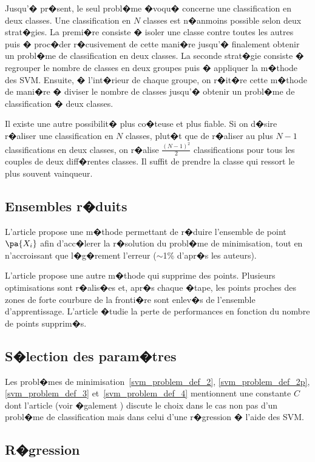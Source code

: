 Jusqu'� pr�sent, le seul probl�me �voqu� concerne une classification en deux classes. Une classification en $N$ classes est n�anmoins possible selon deux strat�gies. La premi�re consiste � isoler une classe contre toutes les autres puis � proc�der r�cusivement de cette mani�re jusqu'� finalement obtenir un probl�me de classification en deux classes. La seconde strat�gie consiste � regrouper le nombre de classes en deux groupes puis � appliquer la m�thode des SVM. Ensuite, � l'int�rieur de chaque groupe, on r�it�re cette m�thode de mani�re � diviser le nombre de classes jusqu'� obtenir un probl�me de classification � deux classes.

Il existe une autre possibilit� plus co�teuse et plus fiable. Si on d�sire r�aliser une classification en $N$ classes, plut�t que de r�aliser au plus $N-1$ classifications en deux classes, on r�alise $\frac{(N-1)^2}{2}$ classifications pour tous les couples de deux diff�rentes classes. Il suffit de prendre la classe qui ressort le plus souvent vainqueur.


\subsection{Ensembles r�duits}

L'article  propose une m�thode permettant de r�duire l'ensemble de point $\pa{X_i}$ afin d'acc�lerer la r�solution du probl�me de minimisation, tout en n'accroissant que l�g�rement l'erreur ($\sim$1\% d'apr�s les auteurs). 

L'article  propose une autre m�thode qui supprime des points. Plusieurs optimisations sont r�alis�es et, apr�s chaque �tape, les points proches des zones de forte courbure de la fronti�re sont enlev�s de l'ensemble d'apprentissage. L'article �tudie la perte de performances en fonction du nombre de points supprim�s.


\subsection{S�lection des param�tres}

Les probl�mes de minimisation~\ref{svm_problem_def_2}, \ref{svm_problem_def_2p}, \ref{svm_problem_def_3} et~\ref{svm_problem_def_4} mentionnent une constante $C$ dont l'article  (voir �galement ) discute le choix dans le cas non pas d'un probl�me de classification mais dans celui d'une r�gression � l'aide des SVM.

\subsection{R�gression}








\newpage








